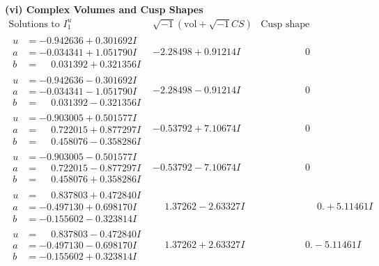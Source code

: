 \documentclass[1p]{elsarticle_modified}
\theoremstyle{definition}
\newcommand{\I}{\sqrt{-1}}
\begin{document}
\newpage\flushleft \textbf{(vi) Complex Volumes and Cusp Shapes}
$$\begin{array}{c|c|c}  
\text{Solutions to }I^u_{1}& \I (\text{vol} + \sqrt{-1}CS) & \text{Cusp shape}\\
 \hline 
\begin{aligned}
u &= -0.942636 + 0.301692 I \\
a &= -0.034341 + 1.051790 I \\
b &= \phantom{-}0.031392 + 0.321356 I\end{aligned}
 & -2.28498 + 0.91214 I & \phantom{-0.000000 } 0 \\ \hline\begin{aligned}
u &= -0.942636 - 0.301692 I \\
a &= -0.034341 - 1.051790 I \\
b &= \phantom{-}0.031392 - 0.321356 I\end{aligned}
 & -2.28498 - 0.91214 I & \phantom{-0.000000 } 0 \\ \hline\begin{aligned}
u &= -0.903005 + 0.501577 I \\
a &= \phantom{-}0.722015 + 0.877297 I \\
b &= \phantom{-}0.458076 - 0.358286 I\end{aligned}
 & -0.53792 + 7.10674 I & \phantom{-0.000000 } 0 \\ \hline\begin{aligned}
u &= -0.903005 - 0.501577 I \\
a &= \phantom{-}0.722015 - 0.877297 I \\
b &= \phantom{-}0.458076 + 0.358286 I\end{aligned}
 & -0.53792 - 7.10674 I & \phantom{-0.000000 } 0 \\ \hline\begin{aligned}
u &= \phantom{-}0.837803 + 0.472840 I \\
a &= -0.497130 + 0.698170 I \\
b &= -0.155602 - 0.323814 I\end{aligned}
 & \phantom{-}1.37262 - 2.63327 I & \phantom{-0.000000 -}0. + 5.11461 I \\ \hline\begin{aligned}
u &= \phantom{-}0.837803 - 0.472840 I \\
a &= -0.497130 - 0.698170 I \\
b &= -0.155602 + 0.323814 I\end{aligned}
 & \phantom{-}1.37262 + 2.63327 I & \phantom{-0.000000 } 0. - 5.11461 I \\ \hline\begin{aligned}

\end{aligned}
\end{array}$$
\end{document}
